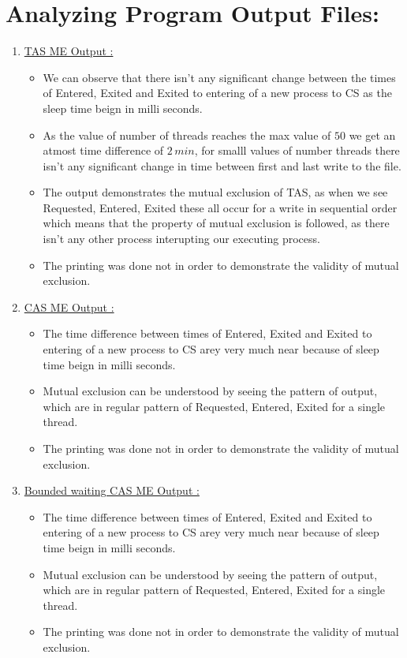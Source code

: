 \documentclass[12pt,a4paper]{article}
\begin{document}
	
	\section{ Analyzing Program Output Files:} 
	\begin{enumerate}[1)]
		\item \underline{TAS ME Output :}
		\begin{itemize}
			\item We can observe that there isn't any significant change between the times of Entered, Exited and Exited to entering of a new process to CS as the sleep time beign in milli seconds. 
			\item As the value of number of threads reaches the max value of $50$ we get an  atmost time difference of $2\,min $, for smalll values of number threads there isn't any significant change in time between first and last write to the file.
			\item The output demonstrates the mutual exclusion of TAS, as when we see  Requested, Entered, Exited these all occur for a write in sequential order which means that the property of mutual exclusion is followed, as there isn't any other process interupting our executing process. 
			\item The printing was done not in order to demonstrate the validity of mutual exclusion.
		\end{itemize}
		\item \underline{CAS ME Output :}
		\begin{itemize}
			\item The time difference between times of Entered, Exited and Exited to entering of a new process to CS arey very much near because of sleep time beign in milli seconds. 
			\item Mutual exclusion can be understood by seeing the pattern of output, which are in regular pattern of Requested, Entered, Exited for a single thread.
			\item The printing was done not in order to demonstrate the validity of mutual exclusion.
		\end{itemize}
		\pagebreak
		\item \underline{Bounded waiting CAS ME Output :}
		\begin{itemize}
			\item The time difference between times of Entered, Exited and Exited to entering of a new process to CS arey very much near because of sleep time beign in milli seconds. 
			\item Mutual exclusion can be understood by seeing the pattern of output, which are in regular pattern of Requested, Entered, Exited for a single thread.
			\item The printing was done not in order to demonstrate the validity of mutual exclusion.
		\end{itemize}
		
	\end{enumerate}
	
\end{document}
